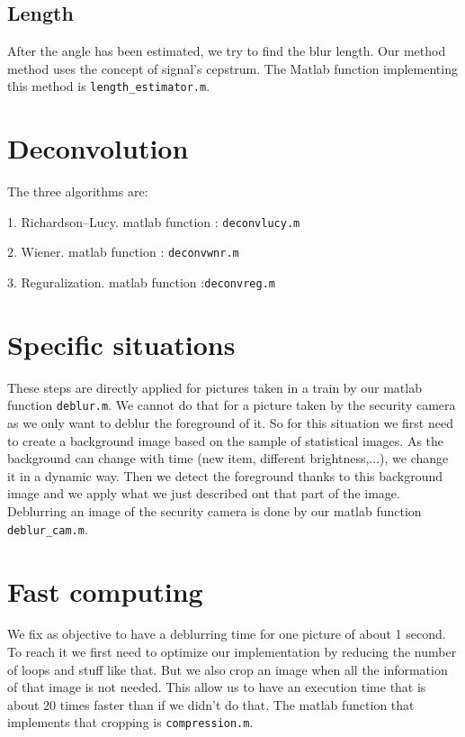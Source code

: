 \subsection{Length}
After the angle has been estimated, we try to find the blur length. Our method method uses the concept of signal's cepstrum. The Matlab function implementing this method is \verb|length_estimator.m|. 

\section{Deconvolution}
The three algorithms are:

1. Richardson–Lucy. matlab function : \texttt{deconvlucy.m}

2. Wiener. matlab function : \texttt{deconvwnr.m}

3. Reguralization. matlab function :\texttt{deconvreg.m}

\section{Specific situations}

These steps are directly applied for pictures taken in a train by our matlab function \texttt{deblur.m}. We cannot do that for a picture taken by the security camera as we only want to deblur the foreground of it. So for this situation we first need to create a background image based on the sample of statistical images. As the background can change with time (new item, different brightness,...), we change it in a dynamic way. Then we detect the foreground thanks to this background image and we apply what we just described ont that part of the image. Deblurring an image of the security camera is done by our matlab function \texttt{deblur_cam.m}.

\section{Fast computing}

We fix as objective to have a deblurring time for one picture of about 1 second. To reach it we first need to optimize our implementation by reducing the number of loops and stuff like that. But we also crop an image when all the information of that image is not needed. This allow us to have an execution time that is about $20$ times faster than if we didn't do that. The matlab function that implements that cropping is \texttt{compression.m}.